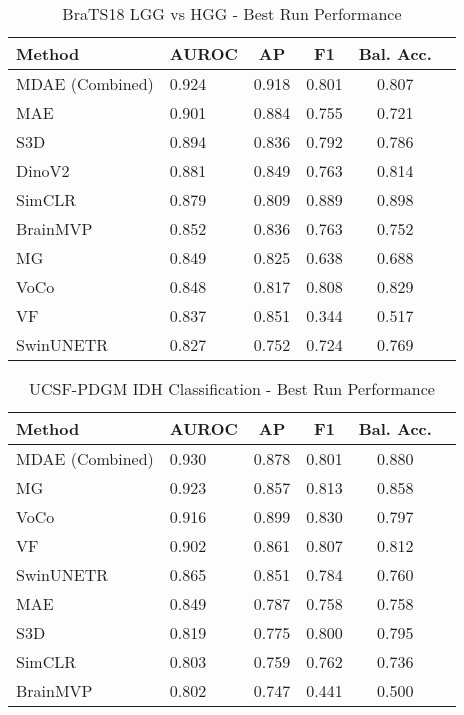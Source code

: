 \begin{table}[h!]
\centering
\caption{BraTS18 LGG vs HGG - Best Run Performance}
\begin{tabular}{llcccc}
\hline
Method & AUROC & AP & F1 & Bal. Acc. \\
\hline
MDAE (Combined) & 0.924 & 0.918 & 0.801 & 0.807 \\
MAE & 0.901 & 0.884 & 0.755 & 0.721 \\
S3D & 0.894 & 0.836 & 0.792 & 0.786 \\
DinoV2 & 0.881 & 0.849 & 0.763 & 0.814 \\
SimCLR & 0.879 & 0.809 & 0.889 & 0.898 \\
BrainMVP & 0.852 & 0.836 & 0.763 & 0.752 \\
MG & 0.849 & 0.825 & 0.638 & 0.688 \\
VoCo & 0.848 & 0.817 & 0.808 & 0.829 \\
VF & 0.837 & 0.851 & 0.344 & 0.517 \\
SwinUNETR & 0.827 & 0.752 & 0.724 & 0.769 \\
\hline
\end{tabular}
\end{table}


\begin{table}[h!]
\centering
\caption{UCSF-PDGM IDH Classification - Best Run Performance}
\begin{tabular}{llcccc}
\hline
Method & AUROC & AP & F1 & Bal. Acc. \\
\hline
MDAE (Combined) & 0.930 & 0.878 & 0.801 & 0.880 \\
MG & 0.923 & 0.857 & 0.813 & 0.858 \\
VoCo & 0.916 & 0.899 & 0.830 & 0.797 \\
VF & 0.902 & 0.861 & 0.807 & 0.812 \\
SwinUNETR & 0.865 & 0.851 & 0.784 & 0.760 \\
MAE & 0.849 & 0.787 & 0.758 & 0.758 \\
S3D & 0.819 & 0.775 & 0.800 & 0.795 \\
SimCLR & 0.803 & 0.759 & 0.762 & 0.736 \\
BrainMVP & 0.802 & 0.747 & 0.441 & 0.500 \\
\hline
\end{tabular}
\end{table}
